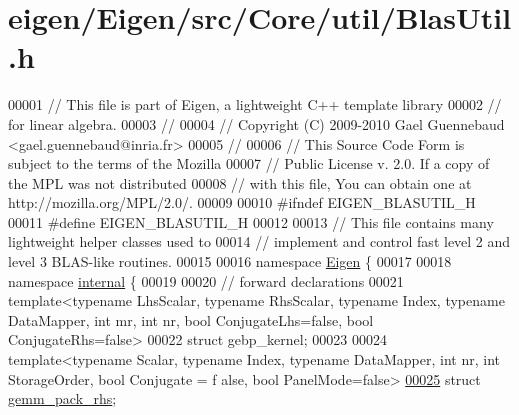 \hypertarget{eigen_2_eigen_2src_2_core_2util_2_blas_util_8h_source}{}\section{eigen/\+Eigen/src/\+Core/util/\+Blas\+Util.h}
\label{eigen_2_eigen_2src_2_core_2util_2_blas_util_8h_source}

\begin{DoxyCode}
00001 \textcolor{comment}{// This file is part of Eigen, a lightweight C++ template library}
00002 \textcolor{comment}{// for linear algebra.}
00003 \textcolor{comment}{//}
00004 \textcolor{comment}{// Copyright (C) 2009-2010 Gael Guennebaud <gael.guennebaud@inria.fr>}
00005 \textcolor{comment}{//}
00006 \textcolor{comment}{// This Source Code Form is subject to the terms of the Mozilla}
00007 \textcolor{comment}{// Public License v. 2.0. If a copy of the MPL was not distributed}
00008 \textcolor{comment}{// with this file, You can obtain one at http://mozilla.org/MPL/2.0/.}
00009 
00010 \textcolor{preprocessor}{#ifndef EIGEN\_BLASUTIL\_H}
00011 \textcolor{preprocessor}{#define EIGEN\_BLASUTIL\_H}
00012 
00013 \textcolor{comment}{// This file contains many lightweight helper classes used to}
00014 \textcolor{comment}{// implement and control fast level 2 and level 3 BLAS-like routines.}
00015 
00016 \textcolor{keyword}{namespace }\hyperlink{namespace_eigen}{Eigen} \{
00017 
00018 \textcolor{keyword}{namespace }\hyperlink{namespaceinternal}{internal} \{
00019 
00020 \textcolor{comment}{// forward declarations}
00021 \textcolor{keyword}{template}<\textcolor{keyword}{typename} LhsScalar, \textcolor{keyword}{typename} RhsScalar, \textcolor{keyword}{typename} Index, \textcolor{keyword}{typename} DataMapper, \textcolor{keywordtype}{int} mr, \textcolor{keywordtype}{int} nr, \textcolor{keywordtype}{bool} 
      ConjugateLhs=false, \textcolor{keywordtype}{bool} ConjugateRhs=false>
00022 \textcolor{keyword}{struct }gebp\_kernel;
00023 
00024 \textcolor{keyword}{template}<\textcolor{keyword}{typename} Scalar, \textcolor{keyword}{typename} Index, \textcolor{keyword}{typename} DataMapper, \textcolor{keywordtype}{int} nr, \textcolor{keywordtype}{int} StorageOrder, \textcolor{keywordtype}{bool} Conjugate = f
      alse, \textcolor{keywordtype}{bool} PanelMode=false>
\hyperlink{struct_eigen_1_1internal_1_1gemm__pack__rhs}{00025} \textcolor{keyword}{struct }\hyperlink{struct_eigen_1_1internal_1_1gemm__pack__rhs}{gemm\_pack\_rhs};

\end{DoxyCode}
